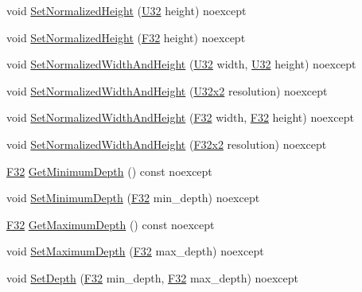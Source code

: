 \begin{DoxyCompactItemize}
\item 
void \hyperlink{classmage_1_1_viewport_a34a8108ba0e9f3915a406b0eb3c3d10b}{Set\+Normalized\+Height} (\hyperlink{namespacemage_a41c104c036fba3756a74e19f793eeaa1}{U32} height) noexcept
\item 
void \hyperlink{classmage_1_1_viewport_ad1516859277f8d872ce59e24dd525d5d}{Set\+Normalized\+Height} (\hyperlink{namespacemage_aa97e833b45f06d60a0a9c4fc22ae02c0}{F32} height) noexcept
\item 
void \hyperlink{classmage_1_1_viewport_a38afbca0a3a883586d335a3a8161245f}{Set\+Normalized\+Width\+And\+Height} (\hyperlink{namespacemage_a41c104c036fba3756a74e19f793eeaa1}{U32} width, \hyperlink{namespacemage_a41c104c036fba3756a74e19f793eeaa1}{U32} height) noexcept
\item 
void \hyperlink{classmage_1_1_viewport_a1fff49679e896410eb3007cb6775de67}{Set\+Normalized\+Width\+And\+Height} (\hyperlink{namespacemage_a88e05bff0300120c013285d3dcad95c5}{U32x2} resolution) noexcept
\item 
void \hyperlink{classmage_1_1_viewport_ae456cd1a570d41bff6939d29722fa8ca}{Set\+Normalized\+Width\+And\+Height} (\hyperlink{namespacemage_aa97e833b45f06d60a0a9c4fc22ae02c0}{F32} width, \hyperlink{namespacemage_aa97e833b45f06d60a0a9c4fc22ae02c0}{F32} height) noexcept
\item 
void \hyperlink{classmage_1_1_viewport_a0d905e73b96493184393b107b5545ae3}{Set\+Normalized\+Width\+And\+Height} (\hyperlink{namespacemage_aa87237ad091f5cd7da612b8523fc108f}{F32x2} resolution) noexcept
\item 
\hyperlink{namespacemage_aa97e833b45f06d60a0a9c4fc22ae02c0}{F32} \hyperlink{classmage_1_1_viewport_a27e673433e78f5382716e670b88d2bb1}{Get\+Minimum\+Depth} () const noexcept
\item 
void \hyperlink{classmage_1_1_viewport_a7e5ea28ca50be25d48668bd8ce4995d5}{Set\+Minimum\+Depth} (\hyperlink{namespacemage_aa97e833b45f06d60a0a9c4fc22ae02c0}{F32} min\+\_\+depth) noexcept
\item 
\hyperlink{namespacemage_aa97e833b45f06d60a0a9c4fc22ae02c0}{F32} \hyperlink{classmage_1_1_viewport_a1f6d41353b7f78afbd6b548d94c13752}{Get\+Maximum\+Depth} () const noexcept
\item 
void \hyperlink{classmage_1_1_viewport_a5f3d52bcaeaa3048d4da86e363131455}{Set\+Maximum\+Depth} (\hyperlink{namespacemage_aa97e833b45f06d60a0a9c4fc22ae02c0}{F32} max\+\_\+depth) noexcept
\item 
void \hyperlink{classmage_1_1_viewport_a15a328f7feb3f17dc1c9af47f30dce3b}{Set\+Depth} (\hyperlink{namespacemage_aa97e833b45f06d60a0a9c4fc22ae02c0}{F32} min\+\_\+depth, \hyperlink{namespacemage_aa97e833b45f06d60a0a9c4fc22ae02c0}{F32} max\+\_\+depth) noexcept
\end{DoxyCompactItemize}
